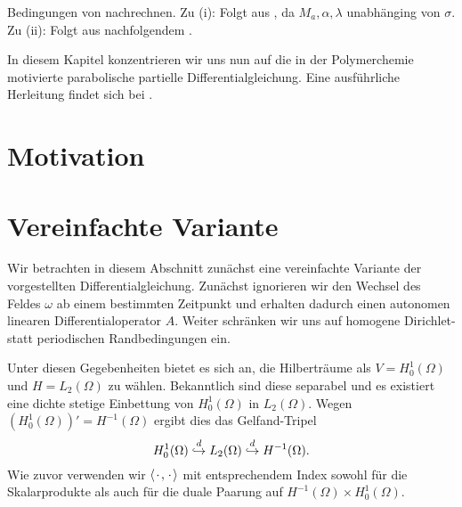 \begin{Beweis}
Bedingungen von  nachrechnen.
Zu (i): Folgt aus , da $M_{a}, \alpha, \lambda$ unabhänging von $\sigma$.
Zu (ii): Folgt aus nachfolgendem .
\end{Beweis}



\newpage



In diesem Kapitel konzentrieren wir uns nun auf die in der Polymerchemie motivierte parabolische partielle Differentialgleichung.
Eine ausführliche Herleitung findet sich bei \textcite{Fredrickson:2006th}.

\section{Motivation} %
\label{sec:motivation}



\section{Vereinfachte Variante} %
\label{sec:vereinfachte_variante}

Wir betrachten in diesem Abschnitt zunächst eine vereinfachte Variante der vorgestellten Differentialgleichung.
Zunächst ignorieren wir den Wechsel des Feldes $\omega$ ab einem bestimmten Zeitpunkt und erhalten dadurch einen autonomen linearen Differentialoperator $A$.
Weiter schränken wir uns auf homogene Dirichlet- statt periodischen Randbedingungen ein.

Unter diesen Gegebenheiten bietet es sich an, die Hilberträume als $V = H^{1}_{0}(\Omega)$ und $H = L_{2}(\Omega)$ zu wählen.
Bekanntlich sind diese separabel und es existiert eine dichte stetige Einbettung von $H^{1}_{0}(\Omega)$ in $L_{2}(\Omega)$.
Wegen $(H^{1}_{0}(\Omega))' = H^{-1}(\Omega)$ ergibt dies das Gelfand-Tripel
\begin{equation}
    H^{1}_{0}(\Omega) \stackrel{d}{\hookrightarrow} L_{2}(\Omega) \stackrel{d}{\hookrightarrow} H^{-1}(\Omega).
\end{equation}
Wie zuvor verwenden wir $\left\langle{\mkern2mu\cdot\mkern2mu},{\mkern2mu\cdot\mkern2mu}\right\rangle$ mit entsprechendem Index sowohl für die Skalarprodukte als auch für die duale Paarung auf $H^{-1}(\Omega) \times H^{1}_{0}(\Omega)$.

